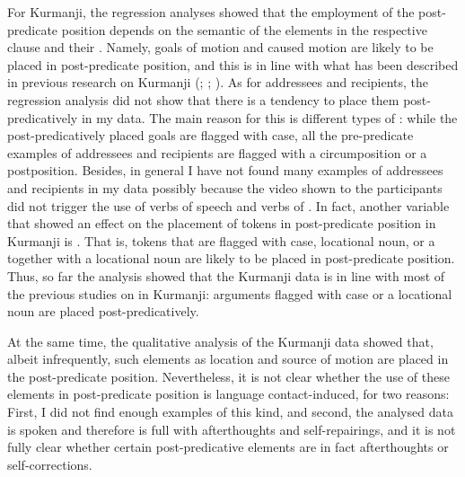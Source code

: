 \documentclass[output=paper,colorlinks,citecolor=brown]{langscibook}
\begin{document}
For Kurmanji, the regression analyses showed that the employment of the post-predicate position depends on the semantic  of the elements in the respective clause and their . Namely, goals of motion and caused motion are likely to be placed in post-predicate position, and this is in line with what has been described in previous research on Kurmanji  (\citealt{haig_verb-goal_2015}; \citealt{haig2018northern}; \citealt{gundogdu2019asymmetries}). As for addressees and recipients, the regression analysis did not show that there is a tendency to place them post-predicatively in my data. The main reason for this is different types of : while the post-predicatively placed goals are flagged with case, all the pre-predicate examples of addressees and recipients are flagged with a circumposition or a postposition. Besides, in general I have not found many examples of addressees and recipients in my data possibly because the video shown to the participants did not trigger the use of verbs of speech and verbs of . In fact, another variable that showed an effect on the placement of tokens in post-predicate position in Kurmanji is . That is, tokens that are flagged with case, locational noun, or a  together with a locational noun are likely to be placed in post-predicate position. Thus, so far the analysis showed that the Kurmanji data is in line with most of the previous studies on  in Kurmanji:  arguments flagged with case or a locational noun are placed post-predicatively. 

At the same time, the qualitative analysis of the Kurmanji data showed that, albeit infrequently, such elements as location and source of motion are placed in the post-predicate position. Nevertheless, it is not clear whether the use of these elements in post-predicate position is language contact-induced, for two reasons: First, I did not find enough examples of this kind, and second, the analysed data is spoken and therefore is full with afterthoughts and self-repairings, and it is not fully clear whether certain post-predicative elements are in fact afterthoughts or self-corrections.
\end{document}
